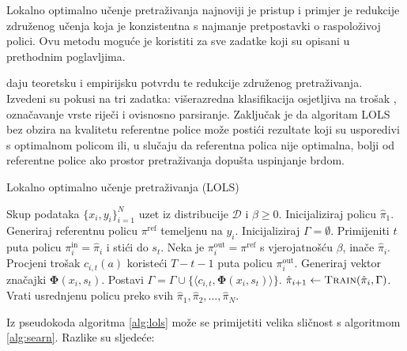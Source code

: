 Lokalno optimalno učenje pretraživanja 
najnoviji je pristup i primjer je redukcije združenog učenja koja je
konzistentna s najmanje pretpostavki o raspoloživoj polici. Ovu metodu moguće je
koristiti za sve zadatke koji su opisani u prethodnim poglavljima.

\cite{daume15lols} daju teoretsku i empirijsku potvrdu te redukcije združenog
pretraživanja. Izvedeni su pokusi na tri zadatka: višerazredna klasifikacija
osjetljiva na trošak ,
označavanje vrste riječi i ovisnosno parsiranje. Zaključak je da algoritam
\textsc{LOLS} bez obzira na kvalitetu referentne police može postići rezultate
koji su usporedivi s optimalnom policom ili, u slučaju da referentna polica nije
optimalna, bolji od referentne police ako prostor pretraživanja dopušta
uspinjanje brdom.

\begin{algorithm}
\caption{Lokalno optimalno učenje pretraživanja (\textsc{LOLS})}\label{alg:lols}
\begin{algorithmic}[1]
\Require Skup podataka $\{x_i, y_i\}_{i=1}^N$ uzet iz distribucije $\mathcal{D}$
         i $\beta \geq 0$. %
\State Inicijaliziraj policu $\hat{\pi}_1$.
  \State Generiraj referentnu policu $\pi^{\text{ref}}$ temeljenu na $y_i$.
  \State Inicijaliziraj $\Gamma = \emptyset$. 
    \State Primijeniti $t$ puta policu $\pi_{i}^{\text{in}} = \hat{\pi}_i$  i stići do $s_t$.  \label{alg:lols:learned}
      \State Neka je  $\pi_{i}^{\text{out}} = \pi^{\text{ref}}$ s vjerojatnošću $\beta$, inače $\hat{\pi}_i$.
      \State Procjeni trošak $c_{i,t}(a)$ koristeći $T-t-1$ puta policu $\pi_{i}^{\text{out}}$.  \label{alg:lols:mixture}
    \EndFor
    \State Generiraj vektor značajki $\mathbf{\Phi}(x_i, s_t)$.
    \State Postavi $\Gamma = \Gamma \cup \{\langle c_{i,t}, \mathbf{\Phi}(x_i, s_t) \rangle\}$.
  \EndFor
  \State $\hat{\pi}_{i+1} \gets \textsc{Train}(\hat{\pi}_i, \Gamma)$.
\EndFor
\State Vrati usrednjenu policu preko svih $\hat{\pi}_1, \hat{\pi}_2, \ldots, \hat{\pi}_N$.
\end{algorithmic}
\end{algorithm}

Iz pseudokoda algoritma \ref{alg:lols} može se primijetiti velika sličnost s
algoritmom \ref{alg:searn}. Razlike su sljedeće:

